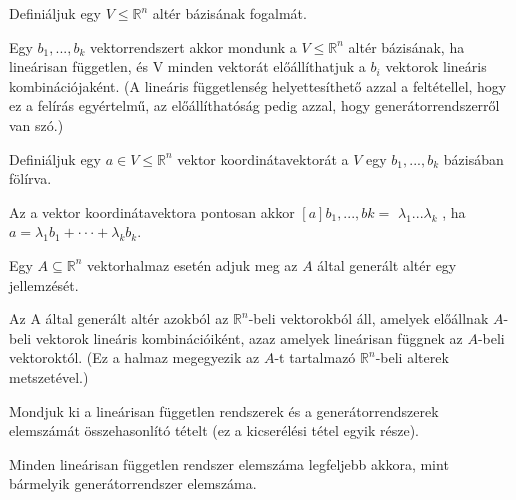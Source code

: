 \begin{frame}
  \begin{tcolorbox}[title={6}]
      Definiáljuk egy $V \leq \mathbb{R}^n$ altér bázisának fogalmát.


  \tcblower
Egy $b_1,...,b_k$ vektorrendszert akkor mondunk a $V \leq \mathbb{R}^n$ altér bázisának, ha lineárisan független, és V minden vektorát előállíthatjuk a $b_i$ vektorok lineáris kombinációjaként. (A lineáris függetlenség helyettesíthető azzal a feltétellel, hogy ez a felírás egyértelmű, az előállíthatóság pedig azzal, hogy generátorrendszerről van szó.)
  \end{tcolorbox}
\end{frame}


\begin{frame}
  \begin{tcolorbox}[title={7}]
      Definiáljuk egy $a \in V \leq \mathbb{R}^n$ vektor koordinátavektorát a $V$ egy $b_1,...,b_k$ bázisában fölírva.


  \tcblower
Az a vektor koordinátavektora pontosan akkor $[a]b_1,...,bk =$
${\lambda}_1 . . . {\lambda}_k$
, ha $a = {\lambda}_1b_1 + \cdot  \cdot  \cdot + {\lambda}_kb_k$.
  \end{tcolorbox}
\end{frame}


\begin{frame}
  \begin{tcolorbox}[title={8}]
       Egy $A {\subseteq} \mathbb{R}^n$ vektorhalmaz esetén adjuk meg az $A$ által generált altér egy jellemzését.


  \tcblower
Az A által generált altér azokból az $\mathbb{R}^n$-beli vektorokból áll, amelyek előállnak $A$-beli vektorok lineáris kombinációiként, azaz amelyek lineárisan függnek az $A$-beli vektoroktól. (Ez a halmaz megegyezik az $A$-t tartalmazó $\mathbb{R}^n$-beli alterek metszetével.)

  \end{tcolorbox}
\end{frame}



\begin{frame}
  \begin{tcolorbox}[title={9}]
     Mondjuk ki a lineárisan független rendszerek és a generátorrendszerek elemszámát összehasonlító tételt (ez a kicserélési tétel egyik része).



  \tcblower
Minden lineárisan független rendszer elemszáma legfeljebb akkora, mint bármelyik generátorrendszer elemszáma.

  \end{tcolorbox}
\end{frame}


